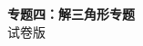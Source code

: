 \documentclass[zihao=-4]{exam-zh}
\begin{document}
\begin{center}
  {\bfseries 专题四：解三角形专题}\\[4pt]
  { 试卷版}
\end{center}

\end{document}
